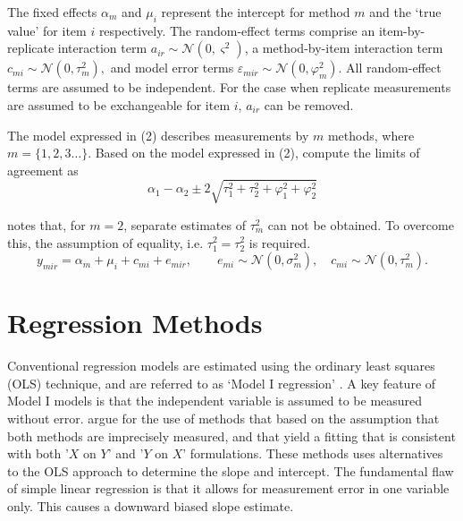 \documentclass[12pt, a4paper]{report}
\theoremstyle{plain}
\theoremstyle{definition}
\theoremstyle{remark}
\begin{document}
The fixed effects $\alpha_{m}$ and $\mu_{i}$ represent the intercept for method $m$ and the `true value' for item $i$ respectively. The random-effect terms comprise an item-by-replicate interaction term $a_{ir} \sim \mathcal{N}(0,\varsigma^{2})$, a method-by-item interaction term $c_{mi} \sim \mathcal{N}(0,\tau^{2}_{m}),$ and model error terms $\varepsilon_{mir} \sim \mathcal{N}(0,\varphi^{2}_{m}).$ All random-effect terms are assumed to be independent. For the case when replicate measurements are assumed to be exchangeable for item $i$, $a_{ir}$ can be removed. 


The model expressed in (2) describes measurements by $m$ methods, where $m = \{1,2,3\ldots\}$. Based on the model expressed in (2), \citet{BXC2008} compute the limits of agreement as
\[
\alpha_1 - \alpha_2 \pm 2 \sqrt{ \tau^2_1 +  \tau^2_2 +  \varphi^2_1 +  \varphi^2_2 }
\]

\citet{BXC2008} notes that, for $m=2$, separate estimates of $\tau^2_m$ can not be obtained. To overcome this, the assumption of equality, i.e. $\tau^2_1 = \tau^2_2$ is required.
\begin{equation}
y_{mir}  = \alpha_{m} + \mu_{i} + c_{mi} + e_{mir}, \qquad  e_{mi}
\sim \mathcal{N}(0,\sigma^{2}_{m}), \quad c_{mi} \sim \mathcal{N}(0,\tau^{2}_{m}).
\end{equation}




\section{Regression Methods}
Conventional regression models are estimated using the ordinary least squares (OLS) technique, and are referred to as `Model I regression' \citep{CornCoch,ludbrook97}. A key feature of Model I models is that the independent variable is assumed to be measured without error. \citet{CornCoch} argue for the use of methods that based on the assumption that both methods are imprecisely measured, and that yield a fitting that is consistent with both '$X$ on $Y$' and '$Y$ on $X$' formulations. These methods uses alternatives to the OLS approach to determine the slope and intercept. The fundamental flaw of simple linear regression is that it allows for measurement error in one variable only. This causes a downward biased slope estimate. 
\end{document}
